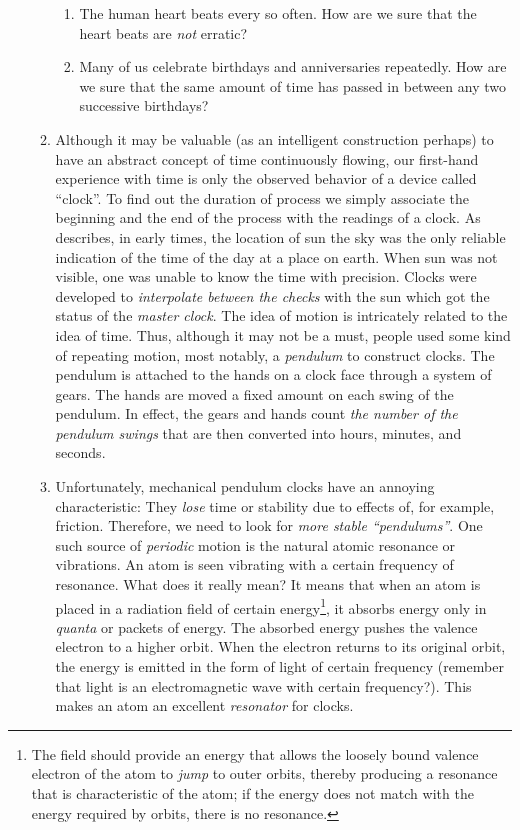 \documentclass[12pt,a4paper]{book}
\begin{document}
\begin{enumerate}
\begin{enumerate}
\begin{enumerate}
                    \item The human heart beats every so often. How are we sure that the heart beats are \emph{not} erratic?
                    \item Many of us celebrate birthdays and anniversaries repeatedly. How are we sure that the same amount of time has passed in between any two successive birthdays?
                \end{enumerate}
            \item  Although it may be valuable (as an intelligent construction perhaps) to have an abstract concept of time continuously flowing, our first-hand experience with time is only the observed behavior of a device called ``clock''. To find out the duration of process we simply associate the beginning and the end of the process with the readings of a clock. As \cite{nbs-time-freq} describes, in early times, the location of sun the sky was the only reliable indication of the time of the day at a place on earth. When sun was not visible, one was unable to know the time with precision. Clocks were developed to \emph{interpolate between the checks} with the sun which got the status of the \emph{master clock}. The idea of motion is intricately related to the idea of time. Thus, although it may not be a must, people used some kind of repeating motion, most notably, a \emph{pendulum} to construct clocks. The pendulum is attached to the hands on a clock face through a system of gears. The hands are moved a fixed amount on each swing of the pendulum. In effect, the gears and hands count \emph{the number of the pendulum swings} that are then converted into hours, minutes, and seconds.
            \item Unfortunately, mechanical pendulum clocks have an annoying characteristic: They \emph{lose} time or stability due to effects of, for example, friction. Therefore, we need to look for \emph{more stable ``pendulums''}. One such source of \emph{periodic} motion is the natural atomic resonance or vibrations. An atom is seen vibrating with a certain frequency of resonance. What does it really mean? It means that when an atom is placed in a radiation field of certain energy\footnote{The field should provide an energy that allows the loosely bound valence electron of the atom to \emph{jump} to outer orbits, thereby producing a resonance that is characteristic of the atom; if the energy does not match with the energy required by orbits, there is no resonance.}, it absorbs energy only in \emph{quanta} or packets of energy. The absorbed energy pushes the valence electron to a higher orbit. When the electron returns to its original orbit, the energy is emitted in the form of light of certain frequency (remember that light is an electromagnetic wave with certain frequency?). This makes an atom an excellent \emph{resonator} for clocks. 

\end{enumerate}
\end{enumerate}
\end{document}
